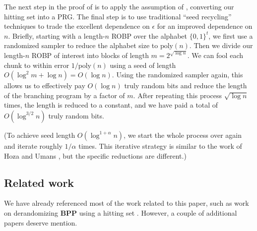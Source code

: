\documentclass{toc}
\begin{document}
The next step in the proof of  is to apply the assumption of , converting our hitting set into a PRG. The final step is to use traditional ``seed recycling'' techniques to trade the excellent dependence on $\epsilon$ for an improved dependence on $n$. Briefly, starting with a length-$n$ ROBP over the alphabet $\{0, 1\}^t$, we first use a randomized sampler \cite{GW97} to reduce the alphabet size to $\text{poly}(n)$. Then we divide our length-$n$ ROBP of interest into blocks of length $m = 2^{\sqrt{\log n}}$. We can fool each chunk to within error $1/\text{poly}(n)$ using a seed of length $O(\log^2 m + \log n) = O(\log n)$. Using the randomized sampler again, this allows us to effectively pay $O(\log n)$ truly random bits and reduce the length of the branching program by a factor of $m$. After repeating this process $\sqrt{\log n}$ times, the length is reduced to a constant, and we have paid a total of $O(\log^{3/2} n)$ truly random bits.

(To achieve seed length $O(\log^{1 + \alpha} n)$, we start the whole process over again and iterate roughly $1/\alpha$ times. This iterative strategy is similar to the work of Hoza and Umans \cite{HU22}, but the specific reductions are different.)

\subsection{Related work}

We have already referenced most of the work related to this paper, such as work on derandomizing $\mathbf{BPP}$ using a hitting set \cite{ACR98, BF99, ACRT99, GVW11}. However, a couple of additional papers deserve mention.
\end{document}
